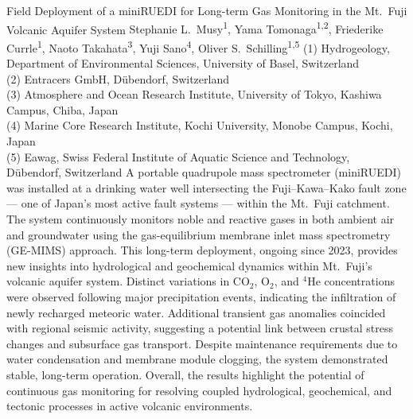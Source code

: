 \begin{conf-abstract}
{Field Deployment of a miniRUEDI for Long-term Gas Monitoring in the Mt.~Fuji Volcanic Aquifer System}
{Stephanie L.~Musy\textsuperscript{1},
Yama Tomonaga\textsuperscript{1,2},
Friederike Currle\textsuperscript{1},
Naoto Takahata\textsuperscript{3},
Yuji Sano\textsuperscript{4},
Oliver S.~Schilling\textsuperscript{1,5}}
{
(1) Hydrogeology, Department of Environmental Sciences, University of Basel, Switzerland\\
(2) Entracers GmbH, Dübendorf, Switzerland\\
(3) Atmosphere and Ocean Research Institute, University of Tokyo, Kashiwa Campus, Chiba, Japan\\
(4) Marine Core Research Institute, Kochi University, Monobe Campus, Kochi, Japan\\
(5) Eawag, Swiss Federal Institute of Aquatic Science and Technology, Dübendorf, Switzerland
}
{A portable quadrupole mass spectrometer (miniRUEDI) was installed at a drinking water well intersecting the Fuji–Kawa–Kako fault zone — one of Japan’s most active fault systems — within the Mt.~Fuji catchment. The system continuously monitors noble and reactive gases in both ambient air and groundwater using the gas-equilibrium membrane inlet mass spectrometry (GE-MIMS) approach. This long-term deployment, ongoing since 2023, provides new insights into hydrological and geochemical dynamics within Mt.~Fuji’s volcanic aquifer system. Distinct variations in CO$_2$, O$_2$, and $^4$He concentrations were observed following major precipitation events, indicating the infiltration of newly recharged meteoric water. Additional transient gas anomalies coincided with regional seismic activity, suggesting a potential link between crustal stress changes and subsurface gas transport. Despite maintenance requirements due to water condensation and membrane module clogging, the system demonstrated stable, long-term operation. Overall, the results highlight the potential of continuous gas monitoring for resolving coupled hydrological, geochemical, and tectonic processes in active volcanic environments.}
\end{conf-abstract}
